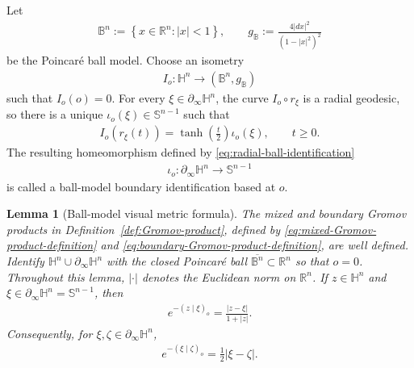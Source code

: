 \documentclass[11pt]{amsart}
\theoremstyle{plain}
\newtheorem{lemma}[theorem]{Lemma}
\theoremstyle{plain}
\theoremstyle{plain}
\newcommand{\Hn}{\mathbb H^n}
\newcommand{\bdry}{\partial_\infty}
\numberwithin{equation}{section}
\begin{document}
Let
\begin{align}
\mathbb B^n
:=
\left\{
x\in\mathbb R^n:|x|<1
\right\},
\qquad
g_{\mathbb B}
:=
\frac{4|dx|^2}{(1-|x|^2)^2}
\nonumber
\end{align}
be the Poincar\'e ball model. Choose an isometry
\begin{align}
I_o:\Hn\longrightarrow(\mathbb B^n,g_{\mathbb B})
\nonumber
\end{align}
such that \(I_o(o)=0\). For every \(\xi\in\bdry\Hn\), the curve
\(I_o\circ r_\xi\) is a radial geodesic, so there is a unique
\(\iota_o(\xi)\in\mathbb S^{n-1}\) such that
\begin{align}
I_o(r_\xi(t))
=
\tanh\left(\frac t2\right)\iota_o(\xi),
\qquad
t\geq0.
\label{eq:radial-ball-identification}
\end{align}
The resulting homeomorphism
defined by \eqref{eq:radial-ball-identification}
\begin{align}
\iota_o:\bdry\Hn\longrightarrow\mathbb S^{n-1}
\nonumber
\end{align}
is called a ball-model boundary identification based at \(o\).


\begin{lemma}[Ball-model visual metric formula]
\label{lem:elementary-hyperbolic-boundary-estimates}
The mixed and boundary Gromov products in
Definition~\ref{def:Gromov-product}, defined by
\eqref{eq:mixed-Gromov-product-definition} and
\eqref{eq:boundary-Gromov-product-definition}, are well defined. Identify
\(\Hn\cup\bdry\Hn\) with the closed Poincar\'e ball
\(\overline{\mathbb B^n}\subset\mathbb R^n\) so that
\(o=0\).  Throughout this lemma, \(|\cdot|\) denotes the
Euclidean norm on \(\mathbb R^n\).  If \(z\in\Hn\) and
\(\xi\in\bdry\Hn=\mathbb S^{n-1}\), then
\begin{align}
e^{-(z\mid\xi)_o}
=
\frac{|z-\xi|}{1+|z|}.
\label{eq:mixed-visual-ball-formula}
\end{align}
Consequently, for \(\xi,\zeta\in\bdry\Hn\),
\begin{align}
e^{-(\xi\mid\zeta)_o}
=
\frac12|\xi-\zeta|.
\label{eq:visual-is-chordal}
\end{align}
\end{lemma}
\end{document}
